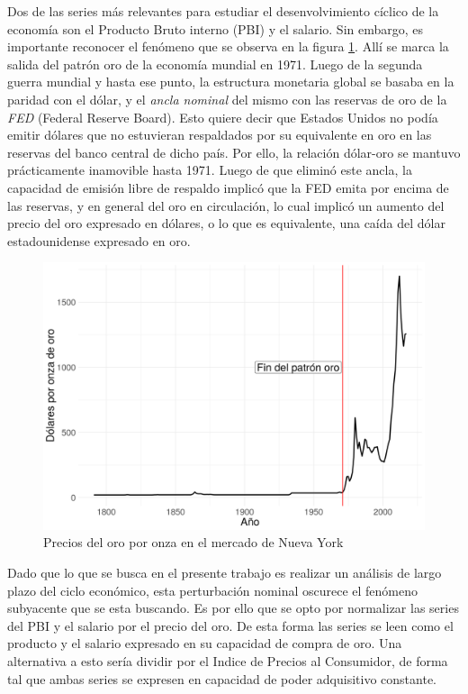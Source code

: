 \documentclass[a4paper]{article}
\begin{document}
Dos de las series más relevantes para estudiar el desenvolvimiento cíclico de la economía son el Producto Bruto interno (PBI) y el salario. Sin embargo, es importante reconocer el fenómeno que se observa en la figura \ref{fig:oro}. Allí se marca la salida del patrón oro de la economía mundial en 1971. Luego de la segunda guerra mundial y hasta ese punto, la estructura monetaria global se basaba en la paridad con el dólar, y el \textit{ancla nominal} del mismo con las reservas de oro de la \textit{FED} (Federal Reserve Board). Esto quiere decir que Estados Unidos no podía emitir dólares que no estuvieran respaldados por su equivalente en oro en las reservas del banco central de dicho país. Por ello, la relación dólar-oro se mantuvo prácticamente inamovible hasta 1971. Luego de que eliminó este ancla, la capacidad de emisión libre de respaldo implicó que la FED emita por encima de las reservas, y en general del oro en circulación, lo cual implicó un aumento del precio del oro expresado en dólares, o lo que es equivalente, una caída del dólar estadounidense expresado en oro.

\begin{figure}[H]
	\centering
	\includegraphics[width=0.8\linewidth]{oro.png}
	\caption{Precios del oro por onza en el mercado de Nueva York} \label{fig:oro}
\end{figure}

Dado que lo que se busca en el presente trabajo es realizar un análisis de largo plazo del ciclo económico, esta perturbación nominal oscurece el fenómeno subyacente que se esta buscando. Es por ello que se opto por normalizar las series del PBI y el salario por el precio del oro. De esta forma las series se leen como el producto y el salario expresado en su capacidad de compra de oro. Una alternativa a esto sería dividir por el Indice de Precios al Consumidor, de forma tal que ambas series se expresen en capacidad de poder adquisitivo constante. 
\end{document}
